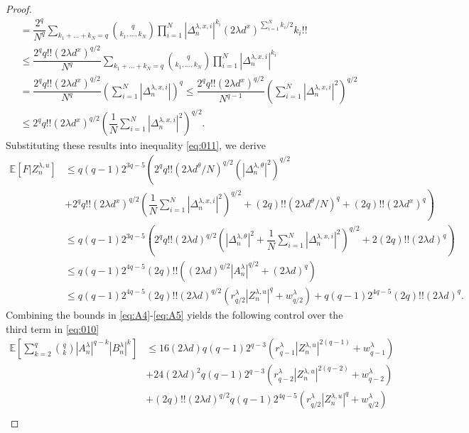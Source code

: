 \documentclass[10pt,a4paper]{amsart}
\begin{document}
\begin{proof}
\begin{align*}
&=\dfrac{2^q}{N^q}\sum_{k_1+\ldots+k_N=q}\binom{q}{k_1,\ldots,k_N}\prod_{i=1}^N |\Delta_n^{\lambda,x,i}|^{k_i}(2\lambda d^x)^{\sum_{i=1}^Nk_i/2}k_i!!\\
&\leq \dfrac{2^q q!!(2\lambda d^x)^{q/2}}{N^q}\sum_{k_1+\ldots+k_N=q}\binom{q}{k_1,\ldots,k_N}\prod_{i=1}^N |\Delta_n^{\lambda,x,i}|^{k_i}\\
&=\dfrac{2^q q!!(2\lambda d^x)^{q/2}}{N^q}\left(\sum_{i=1}^N |\Delta_n^{\lambda,x,i}|\right)^q\leq \dfrac{2^q q!!(2\lambda d^x)^{q/2}}{N^{q-1}}\left(\sum_{i=1}^N |\Delta_n^{\lambda,x,i}|^2\right)^{q/2}\\
&\leq 2^q q!!(2\lambda d^x)^{q/2}\left(\dfrac{1}{N}\sum_{i=1}^N |\Delta_n^{\lambda,x,i}|^2\right)^{q/2}.
\end{align*}Substituting these results into inequality \eqref{eq:011}, we derive
\begin{align}
\mathbb{E}[F|Z_n^{\lambda,u}]&\leq q(q-1)2^{3q-5}\left(2^qq!!(2\lambda d^{\theta}/N)^{q/2}\left(|\Delta_n^{\lambda,\theta}|^2\right)^{q/2}\right.\nonumber\\
&\left.+2^q q!!(2\lambda d^x)^{q/2}\left(\dfrac{1}{N}\sum_{i=1}^N |\Delta_n^{\lambda,x,i}|^2\right)^{q/2}+(2q)!!(2\lambda d^{\theta}/N)^{q}+(2q)!!(2\lambda d^{x})^{q}\right)\nonumber\\
&\leq q(q-1)2^{3q-5}\left(2^qq!!(2\lambda d)^{q/2}\left(|\Delta_n^{\lambda,\theta}|^2+\dfrac{1}{N}\sum_{i=1}^N |\Delta_n^{\lambda,x,i}|^2\right)^{q/2}+2(2q)!!(2\lambda d)^q\right)\nonumber\\
&\leq q(q-1)2^{4q-5}(2q)!!\left((2\lambda d)^{q/2} \left|A_n^{\lambda}\right|^{q/2}+(2\lambda d)^q\right)\nonumber\\
&\leq q(q-1)2^{4q-5}(2q)!!(2\lambda d)^{q/2}\left(r^{\lambda}_{q/2}|Z_n^{\lambda,u}|^q+w^{\lambda}_{q/2}\right)+q(q-1)2^{4q-5}(2q)!!(2\lambda d)^q.\label{eq:A5}
\end{align}
Combining the bounds in \eqref{eq:A4}-\eqref{eq:A5} yields the following control over the third term in \eqref{eq:010}
\begin{align}
\mathbb{E}\left[\sum_{k=2}^q\binom{q}{k}|A_n^{\lambda}|^{q-k}|B^{\lambda}_n|^k\right]
&\leq 16(2\lambda d)q(q-1)2^{q-3} \left(r_{q-1}^{\lambda}|Z_n^{\lambda,u}|^{2(q-1)}+w_{q-1}^{\lambda}\right)\nonumber\\&+24(2\lambda d)^2q(q-1)2^{q-3} \left(r_{q-2}^{\lambda}|Z_n^{\lambda,u}|^{2(q-2)}+w_{q-2}^{\lambda}\right)\nonumber\\
&+ (2q)!!(2\lambda d)^{q/2}q(q-1)2^{4q-5}\left(r^{\lambda}_{q/2}|Z_n^{\lambda,u}|^q+w^{\lambda}_{q/2}\right)\nonumber\\

\end{align}
\end{proof}
\end{document}
